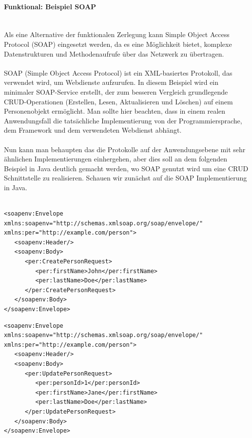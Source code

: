 \paragraph{Funktional: Beispiel SOAP\\\\}
Als eine Alternative der funktionalen Zerlegung kann Simple Object Access Protocol (SOAP) eingesetzt werden, da es eine Möglichkeit bietet, komplexe Datenstrukturen und Methodenaufrufe über das Netzwerk zu übertragen.
\\\\
SOAP (Simple Object Access Protocol) ist ein XML-basiertes Protokoll, das verwendet wird, um Webdienste aufzurufen. In diesem Beispiel wird ein minimaler SOAP-Service erstellt, der zum besseren Vergleich grundlegende CRUD-Operationen (Erstellen, Lesen, Aktualisieren und Löschen) auf einem Personenobjekt ermöglicht. Man sollte hier beachten, dass in einem realen Anwendungsfall die tatsächliche Implementierung von der Programmiersprache, dem Framework und dem verwendeten Webdienst abhängt.
\\\\
Nun kann man behaupten das die Protokolle auf der Anwendungsebene mit sehr ähnlichen Implementierungen einhergehen, aber dies soll an dem folgenden Beispiel in Java deutlich gemacht werden, wo SOAP genutzt wird um eine CRUD Schnittstelle  zu realisieren. 
Schauen wir zunächst auf die SOAP Implementierung in Java. \\\\
\noindent\begin{minipage}{\textwidth}
\begin{lstlisting}[caption={SOAP create},captionpos=b,label={lst:s_create}]
<soapenv:Envelope xmlns:soapenv="http://schemas.xmlsoap.org/soap/envelope/" xmlns:per="http://example.com/person">
   <soapenv:Header/>
   <soapenv:Body>
      <per:CreatePersonRequest>
         <per:firstName>John</per:firstName>
         <per:lastName>Doe</per:lastName>
      </per:CreatePersonRequest>
   </soapenv:Body>
</soapenv:Envelope>
\end{lstlisting}
\end{minipage}
\noindent\begin{minipage}{\textwidth}
\begin{lstlisting}[caption={SOAP update},captionpos=b,label={lst:s_update}]
<soapenv:Envelope xmlns:soapenv="http://schemas.xmlsoap.org/soap/envelope/" xmlns:per="http://example.com/person">
   <soapenv:Header/>
   <soapenv:Body>
      <per:UpdatePersonRequest>
         <per:personId>1</per:personId>
         <per:firstName>Jane</per:firstName>
         <per:lastName>Doe</per:lastName>
      </per:UpdatePersonRequest>
   </soapenv:Body>
</soapenv:Envelope>
\end{lstlisting}
\end{minipage}
